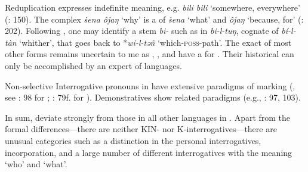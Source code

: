 \largerpage
Reduplication expresses indefinite meaning, e.g. \textit{bili bili} ‘somewhere, everywhere’ (\citealt{Castrén1858}: 150). The complex  \textit{ṡena ôjaŋ} ‘why’ is a   of \textit{ṡena} ‘what’ and \textit{ôjaŋ} ‘because, for’ (\citealt{Castrén1858}: 202). Following \citet[88]{Vajda2013}, one may identify a stem \textit{bi-} such as in \textit{bi-l-tuŋ}, cognate of  \textit{bí-l-tàn} ‘whither’, that goes back to  *\textit{wi-l-təñ} ‘which-\textsc{poss}-path’. The exact  of most other forms remains uncertain to me as , , and  have a  for  . Their historical  can only be accomplished by an expert of  languages.

Non-selective Interrogative pronouns in  have extensive paradigms of  marking (, see \citealt{Werner1997b}: 98 for ; \citealt{Werner1997c}: 79f. for ). Demonstratives show related paradigms (e.g., \citealt{Werner1997b}: 97, 103).

In sum,   deviate strongly from those in all other languages in . Apart from the formal differences---there are neither KIN- nor K-interrogatives---there are unusual categories such as a  distinction in the personal interrogatives, incorporation, and a large number of different interrogatives with the meaning ‘who’ and ‘what’.

